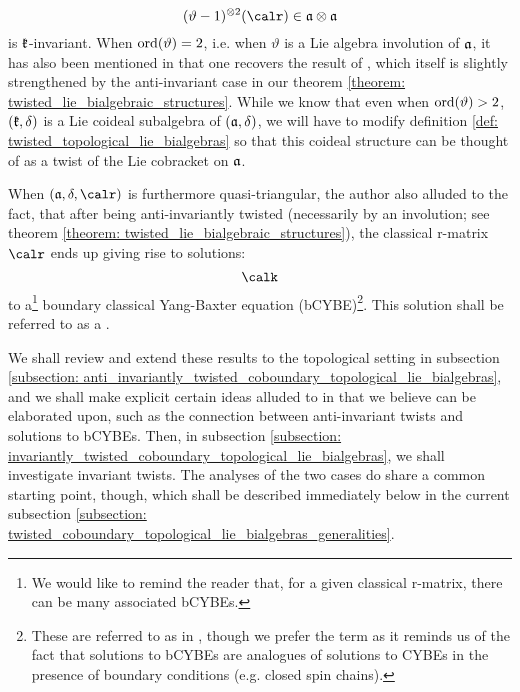             $$(\vartheta - 1)^{\tensor 2}(\calr) \in \a \tensor \a$$
        is $\mathfrak{k}$-invariant. When $\operatorname{ord}(\vartheta) = 2$, i.e. when $\vartheta$ is a Lie algebra involution of $\mathfrak{a}$, it has also been mentioned in \cite{schrader_integrable_systems_from_classical_reflection_equations} that one recovers the result of \cite{belliard_crampe_coideal_subalgebras_from_twisted_manin_triples}, which itself is slightly strengthened by the anti-invariant case in our theorem \ref{theorem: twisted_lie_bialgebraic_structures}. While we know that even when $\operatorname{ord}(\vartheta) > 2$, $(\mathfrak{k}, \delta)$ is a Lie coideal subalgebra of $(\mathfrak{a}, \delta)$, we will have to modify definition \ref{def: twisted_topological_lie_bialgebras} so that this coideal structure can be thought of as a twist of the Lie cobracket on $\mathfrak{a}$.
        
        When $(\a, \delta, \calr)$ is furthermore quasi-triangular, the author also alluded to the fact, that after being anti-invariantly twisted (necessarily by an involution; see theorem \ref{theorem: twisted_lie_bialgebraic_structures}), the classical r-matrix $\calr$ ends up giving rise to solutions:
            $$\calk$$
        to a\footnote{We would like to remind the reader that, for a given classical r-matrix, there can be many associated bCYBEs.} boundary classical Yang-Baxter equation (bCYBE)\footnote{These are referred to as  in \cite{schrader_integrable_systems_from_classical_reflection_equations}, though we prefer the term  as it reminds us of the fact that solutions to bCYBEs are analogues of solutions to CYBEs in the presence of boundary conditions (e.g. closed spin chains).}. This solution shall be referred to as a .
        
        We shall review and extend these results to the topological setting in subsection \ref{subsection: anti_invariantly_twisted_coboundary_topological_lie_bialgebras}, and we shall make explicit certain ideas alluded to in \cite{schrader_integrable_systems_from_classical_reflection_equations} that we believe can be elaborated upon, such as the connection between anti-invariant twists and solutions to bCYBEs. Then, in subsection \ref{subsection: invariantly_twisted_coboundary_topological_lie_bialgebras}, we shall investigate invariant twists. The analyses of the two cases do share a common starting point, though, which shall be described immediately below in the current subsection \ref{subsection: twisted_coboundary_topological_lie_bialgebras_generalities}.

